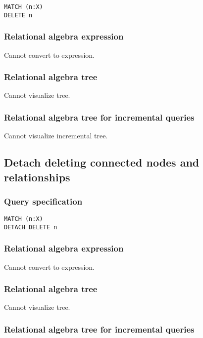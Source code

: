 \begin{lstlisting}
MATCH (n:X)
DELETE n
\end{lstlisting}

\subsubsection*{Relational algebra expression}

Cannot convert to expression.

\subsubsection*{Relational algebra tree}

Cannot visualize tree.

\subsubsection*{Relational algebra tree for incremental queries}

Cannot visualize incremental tree.

\subsection{Detach deleting connected nodes and relationships}

\subsubsection*{Query specification}

\begin{lstlisting}
MATCH (n:X)
DETACH DELETE n
\end{lstlisting}

\subsubsection*{Relational algebra expression}

Cannot convert to expression.

\subsubsection*{Relational algebra tree}

Cannot visualize tree.

\subsubsection*{Relational algebra tree for incremental queries}


